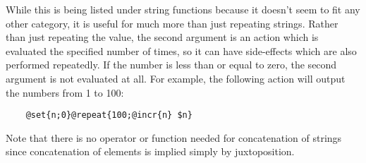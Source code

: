 \begin{description}
While this is being listed under string functions because it doesn't seem
to fit any other category, it is useful for much more than just
repeating strings.  Rather than just repeating the value, the second
argument is an action which is evaluated the specified number of times,
so it can have side-effects which are also performed repeatedly.
If the number is less than or equal to zero, the second
argument is not evaluated at all.
For example, the
following action will output the numbers from 1 to 100:
\begin{verbatim}
    @set{n;0}@repeat{100;@incr{n} $n}
\end{verbatim}



\end{description}

Note that there is no operator or function needed for concatenation of
strings since concatenation of elements is implied simply by
juxtoposition.

